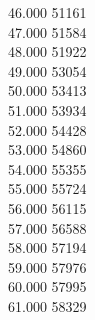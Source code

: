 { 46.000	51161 \\
 47.000	51584 \\
 48.000	51922 \\
 49.000	53054 \\
 50.000	53413 \\
 51.000	53934 \\
 52.000	54428 \\
 53.000	54860 \\
 54.000	55355 \\
 55.000	55724 \\
 56.000	56115 \\
 57.000	56588 \\
 58.000	57194 \\
 59.000	57976 \\
 60.000	57995 \\
 61.000	58329 \\
}
